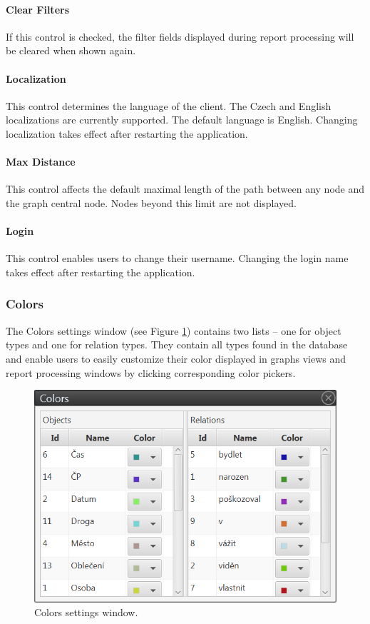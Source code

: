 \paragraph{Clear Filters} If this control is checked, the filter fields
displayed during report processing will be cleared when shown again.

\paragraph{Localization} This control determines the language of the \textan{}
client. The Czech and English localizations are currently supported. The
default language is English. Changing localization takes effect after
restarting the application.

\paragraph{Max Distance} This control affects the default maximal length of the
path between any node and the graph central node. Nodes beyond this limit are
not displayed.

\paragraph{Login} This control enables users to change their username. Changing
the login name takes effect after restarting the application.

\subsubsection{Colors}

The Colors settings window (see Figure \ref{fig:Colors}) contains two lists --
one for object types and one for relation types. They contain all types found
in the database and enable users to easily customize their color displayed in
graphs views and report processing windows by clicking corresponding color
pickers.

\begin{figure}[!htb]
        \centering
        \includegraphics[width=\textwidth]{Images/colors}
        \caption{Colors settings window.}
        \label{fig:Colors}
\end{figure}

